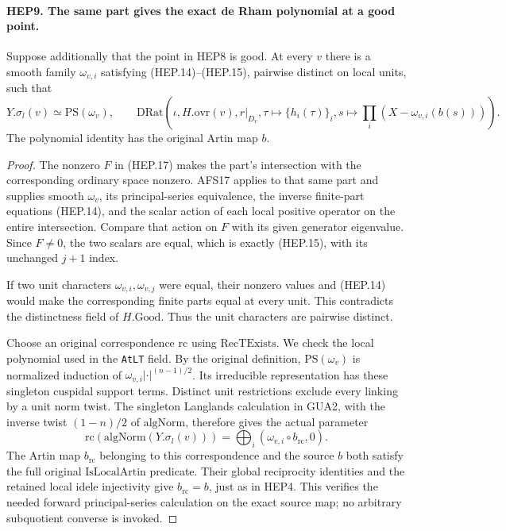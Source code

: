 \paragraph{HEP9. The same part gives the exact de Rham polynomial at a good point.}
\label{claim:HEP9}
Suppose additionally that the point in HEP8 is good.  At every $v$
there is a smooth family $\omega_{v,i}$ satisfying
(HEP.14)--(HEP.15), pairwise distinct on local units, such that
\[
 Y.\sigma_l(v)\simeq\mathrm{PS}(\omega_v),
 \qquad
 \mathrm{DRat}\left(\iota,H.\mathrm{ovr}(v),r|_{D_v},
     \tau\mapsto\{h_i(\tau)\}_i,
     s\mapsto\prod_i(X-\omega_{v,i}(b(s)))\right).
 \tag{HEP.18}
\]
The polynomial identity has the original Artin map $b$.
\begin{proof}
The nonzero $F$ in (HEP.17) makes the part's intersection with
the corresponding ordinary space nonzero.  AFS17 applies to
that same part and supplies smooth $\omega_v$, its principal-series
equivalence, the inverse finite-part equations (HEP.14), and the
scalar action of each local positive operator on the entire
intersection.  Compare that action on $F$ with its given
generator eigenvalue.  Since $F\ne0$, the two scalars are equal,
which is exactly (HEP.15), with its unchanged $j+1$ index.

If two unit characters $\omega_{v,i},\omega_{v,j}$ were equal,
their nonzero values and (HEP.14) would make the corresponding
finite parts equal at every unit.  This contradicts the distinctness
field of $H.\mathrm{Good}$.  Thus the unit characters are pairwise
distinct.

Choose an original correspondence $\mathrm{rc}$ using
$\mathrm{RecTExists}$.  We check the local polynomial used in
the \texttt{AtLT} field.  By the original definition,
$\mathrm{PS}(\omega_v)$ is normalized induction of
$\omega_{v,i}|\cdot|^{(n-1)/2}$.  Its irreducible representation
has these singleton cuspidal support terms.  Distinct unit
restrictions exclude every linking by a unit norm twist.
The singleton Langlands calculation in GUA2, with the inverse
twist $(1-n)/2$ of $\mathrm{algNorm}$, therefore gives the actual
parameter
\[
 \mathrm{rc}(\mathrm{algNorm}(Y.\sigma_l(v)))
                   =\bigoplus_i(\omega_{v,i}\circ b_{\mathrm{rc}},0).
 \tag{HEP.19}
\]
The Artin map $b_{\mathrm{rc}}$ belonging to this correspondence
and the source $b$ both satisfy the full original
$\mathrm{IsLocalArtin}$ predicate.  Their global reciprocity
identities and the retained local idele injectivity give
$b_{\mathrm{rc}}=b$, just as in HEP4.
This verifies the needed forward principal-series calculation on
the exact source map; no arbitrary subquotient converse is invoked.


\end{proof}
